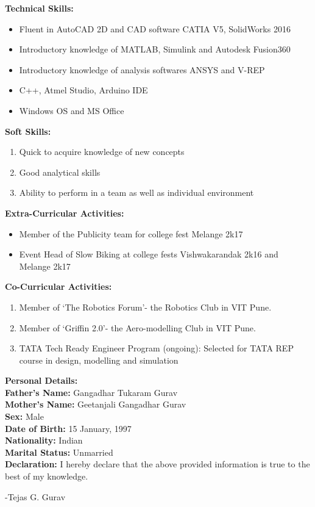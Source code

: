 \documentclass{article}
\begin{document}
\begin{flushleft}
		\medskip
		\textbf{Technical Skills:} 
		\begin{itemize}
			\item Fluent in AutoCAD 2D and CAD software CATIA V5, SolidWorks 2016
			\item Introductory knowledge of MATLAB, Simulink and Autodesk Fusion360
			\item Introductory knowledge of analysis softwares ANSYS and V-REP
			\item C++, Atmel Studio, Arduino IDE
			\item Windows OS and MS Office
		\end{itemize}
		
		\pagebreak
		\textbf{Soft Skills:} 
		\begin{enumerate}
			\item Quick to acquire knowledge of new concepts
			\item Good analytical skills
			\item Ability to perform in a team as well as individual environment
		\end{enumerate}
	
		\medskip
		\textbf{Extra-Curricular Activities:} 
		\begin{itemize}
			\item Member of the Publicity team for college fest Melange 2k17
			\item Event Head of Slow Biking at college fests Vishwakarandak 2k16 and Melange 2k17
		\end{itemize}
	
		\medskip
		\textbf{Co-Curricular Activities:} 
		\begin{enumerate}
			\item Member of ‘The Robotics Forum’- the Robotics Club in VIT Pune.
			\item Member of ‘Griffin 2.0’- the Aero-modelling Club in VIT Pune.
			\item TATA Tech Ready Engineer Program (ongoing): Selected for TATA REP course in design, modelling and simulation
		\end{enumerate}
	
		\medskip
		\textbf{Personal Details:}\\
		\medskip
		\textbf{Father's Name:} Gangadhar Tukaram Gurav\\
		\textbf{Mother's Name:} Geetanjali Gangadhar Gurav\\
		\textbf{Sex:} Male\\
		\textbf{Date of Birth:} 15 January, 1997\\
		\textbf{Nationality:} Indian\\
		\textbf{Marital Status:} Unmarried\\
		
		\bigskip
		\textbf{Declaration:}	I hereby declare that the above provided information is true to the best of my knowledge.
	\end{flushleft}
	\begin{flushright}
		-Tejas G. Gurav
	\end{flushright}
	
			
\end{document}
